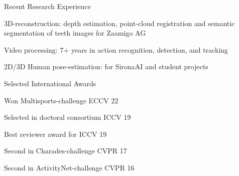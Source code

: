 \documentclass{resume} %
\begin{document}
\begin{paracol}{2}
\begin{rSection}{Recent Research Experience}{} 
\begin{sSubsection}{3D-reconstruction: depth estimation, point-cloud registration and semantic segmentation of teeth images for Zaamigo AG}\end{sSubsection}
\begin{sSubsection}{Video processing: 7+ years in action recognition, detection, and tracking}\end{sSubsection}
\begin{sSubsection}{ 2D/3D Human pose-estimation: for SironaAI and student projects}\end{sSubsection}

\end{rSection}
\switchcolumn
\vspace{0.75mm}
\begin{rSection}{Selected International Awards }{}
\begin{sSubsection}{Won Multisports-challenge ECCV 22}\end{sSubsection} %
\begin{sSubsection}{Selected in doctoral consortium ICCV 19}\end{sSubsection}  %
\begin{sSubsection}{Best reviewer award for ICCV 19}\end{sSubsection} %
\begin{sSubsection}{Second in Charades-challenge CVPR 17}\end{sSubsection} %
\begin{sSubsection}{Second in ActivityNet-challenge CVPR 16}\end{sSubsection} %
\end{rSection}


\end{paracol}
\end{document}
